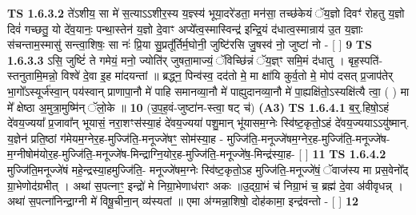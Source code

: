 \documentclass[17pt]{extarticle}
\begin{document}
                                \textbf{ TS 1.6.3.2} \newline
                  ते॑ऽशीय॒ सा मे॑ स॒त्याऽऽशीर॒स्य य॒ज्ञ्स्य॑ भूया॒दरे॑डता॒ मन॑सा॒ तच्छ॑केयं ॅय॒ज्ञो दिवꣳ॑ रोहतु य॒ज्ञो दिवं॑ गच्छतु॒ यो दे॑व॒यानः॒ पन्था॒स्तेन॑ य॒ज्ञो दे॒वाꣳ अप्ये᳚त्व॒स्मास्विन्द्र॑ इन्द्रि॒यं द॑धात्व॒स्मान्राय॑ उ॒त य॒ज्ञाः स॑चन्ताम॒स्मासु॑ सन्त्वा॒शिषः॒ सा नः॑ प्रि॒या सु॒प्रतू᳚र्तिर्म॒घोनी॒ जुष्टि॑रसि जु॒षस्व॑ नो॒ जुष्टा॑ नो - [ ] \textbf{  9} \newline
                  \newline
                                \textbf{ TS 1.6.3.3} \newline
                  ऽसि॒ जुष्टिं॑ ते गमेयं॒ मनो॒ ज्योति॑र् जुषता॒माज्यं॒ ॅविच्छि॑न्नं ॅय॒ज्ञ्ꣳ समि॒मं द॑धातु । बृह॒स्पति॑-स्तनुतामि॒मन्नो॒ विश्वे॑ दे॒वा इ॒ह मा॑दयन्तां ॥ ब्रद्ध्न॒ पिन्व॑स्व॒ दद॑तो मे॒ मा क्षा॑यि कुर्व॒तो मे॒ मोप॑ दसत् प्र॒जाप॑तेर् भा॒गो᳚ऽस्यूर्ज॑स्वा॒न् पय॑स्वान् प्राणापा॒नौ मे॑ पाहि समानव्या॒नौ मे॑ पाह्युदानव्या॒नौ मे॑ पा॒ह्यक्षि॑तो॒ऽस्यक्षि॑त्यै त्वा॒ ( ) मा मे᳚ क्षेष्ठा अ॒मुत्रा॒मुष्मि॑न् ॅलो॒के ॥ \textbf{  10} \newline
                  \newline
                      (उ॒प॒ह॒वं-जुष्टा॑न-स्त्वा॒ षट् च॑)  \textbf{(A3)} \newline \newline
                                        \textbf{ TS 1.6.4.1} \newline
                  ब॒र्॒.हिषो॒ऽहं दे॑वय॒ज्यया᳚ प्र॒जावा᳚न् भूयासं॒ नरा॒शꣳस॑स्या॒हं दे॑वय॒ज्यया॑ पशु॒मान् भू॑यासम॒ग्नेः स्वि॑ष्ट॒कृतो॒ऽहं दे॑वय॒ज्ययाऽऽयु॑ष्मान्. य॒ज्ञेन॑ प्रति॒ष्ठां ग॑मेयम॒ग्नेर॒ह-मुज्जि॑ति॒-मनूज्जे॑षꣳ॒॒ सोम॑स्या॒ह - मुज्जि॑ति॒-मनूज्जे॑षम॒ग्नेर॒ह-मुज्जि॑ति॒-मनूज्जे॑ष-म॒ग्नीषोम॑योर॒ह-मुज्जि॑ति॒-मनूज्जे॑ष-मिन्द्राग्नि॒योर॒ह-मुज्जि॑ति॒-मनूज्जे॑ष॒-मिन्द्र॑स्या॒ह- [ ] \textbf{  11} \newline
                  \newline
                                \textbf{ TS 1.6.4.2} \newline
                  मुज्जि॑ति॒मनूज्जे॑षं महे॒न्द्रस्या॒हमुज्जि॑ति॒- मनूज्जे॑षम॒ग्नेः स्वि॑ष्ट॒कृतो॒ऽह मुज्जि॑ति॒-मनूज्जे॑षं॒ ॅवाज॑स्य मा प्रस॒वेनो᳚द् ग्रा॒भेणोद॑ग्रभीत् । अथा॑ स॒पत्नाꣳ॒॒ इन्द्रो॑ मे निग्रा॒भेणाध॑राꣳ अकः ॥उ॒द्ग्रा॒भं च॑ निग्रा॒भं च॒ ब्रह्म॑ दे॒वा अ॑वीवृधन्न् । अथा॑ स॒पत्ना॑निन्द्रा॒ग्नी मे॑ विषू॒चीना॒न् व्य॑स्यतां ॥ एमा अ॑ग्मन्ना॒शिषो॒ दोह॑कामा॒ इन्द्र॑वन्तो - [ ] \textbf{  12} \newline
                  \newline
\end{document}
